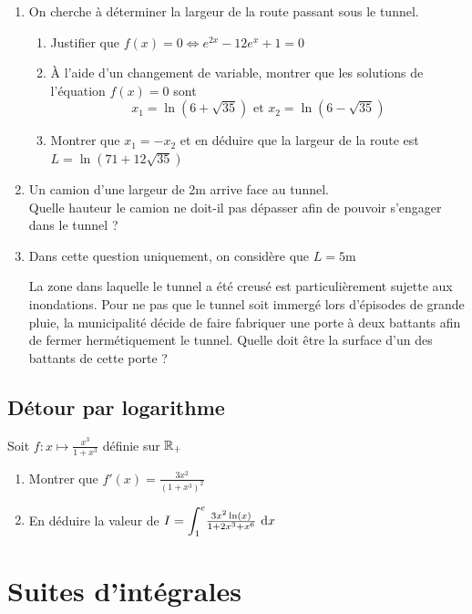 \documentclass[oneside,12pt]{book}          %
\begin{document}
\begin{enumerate}
	\item On cherche à déterminer la largeur de la route passant sous le tunnel.
	\begin{enumerate}
		\item Justifier que $f(x)=0\Leftrightarrow e^{2x}-12e^x+1=0$
		\item À l'aide d'un changement de variable, montrer que les solutions de l'équation $f(x)=0$ sont
            \[x_1=\ln(6+\sqrt{35}) \text{ et } x_2=\ln(6-\sqrt{35})\]
		\item Montrer que $x_1=-x_2$ et en déduire que la largeur de la route est $L=\ln(71+12\sqrt{35})$
	\end{enumerate}
	\item Un camion d'une largeur de 2m arrive face au tunnel.\\    
           Quelle hauteur le camion ne doit-il pas dépasser afin de pouvoir s'engager dans le tunnel ?
	\item Dans cette question uniquement, on considère que $L=5$m
	
	La zone dans laquelle le tunnel a été creusé est particulièrement sujette aux inondations. Pour ne pas 			que le tunnel soit immergé lors d'épisodes de grande pluie, la municipalité décide de faire fabriquer 			une porte à deux battants afin de fermer hermétiquement le tunnel.
	Quelle doit être la surface d'un des battants de cette porte ?
\end{enumerate}



\subsection{Détour par logarithme}
Soit $f:x\mapsto\frac{x^3}{1+x^3}$ définie sur ${\mathbb R}_+$
\begin{enumerate}
    \item Montrer que $f'(x)=\frac{3x^2}{(1+x^3)^2}$
    \item En déduire la valeur de $I={\displaystyle\int_{1}^{e}}\frac{3x^2\ln(x)}{1+2x^3+x^6}{\,\,\mathrm{d}} x$
\end{enumerate}



\section{Suites d'intégrales}
\end{document}
